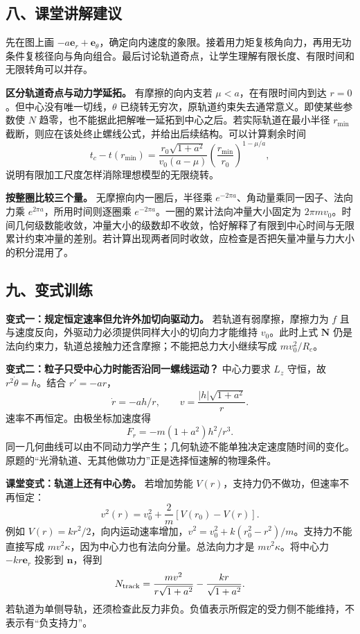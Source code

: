 \documentclass[12pt,a4paper,UTF8]{ctexart}
\begin{document}
\subsection{八、课堂讲解建议}\label{ux516bux8bfeux5802ux8bb2ux89e3ux5efaux8bae-1}

先在图上画
\(-a\boldsymbol e_r+\boldsymbol e_\theta\)，确定向内速度的象限。接着用力矩复核角向力，再用无功条件复核径向与角向组合。最后讨论轨道奇点，让学生理解有限长度、有限时间和无限转角可以并存。

\textbf{区分轨道奇点与动力学延拓。} 有摩擦的向内支若
\(\mu<a\)，在有限时间内到达 \(r=0\)。但中心没有唯一切线，\(\theta\)
已绕转无穷次，原轨道约束失去通常意义。即使某些参数使 \(N\)
趋零，也不能据此把解唯一延拓到中心之后。若实际轨道在最小半径
\(r_{\min}\)
截断，则应在该处终止螺线公式，并给出后续结构。可以计算剩余时间 \[
t_c-t(r_{\min})=
\frac{r_0\sqrt{1+a^2}}{v_0(a-\mu)}
\left(\frac{r_{\min}}{r_0}\right)^{1-\mu/a},
\] 说明有限加工尺度怎样消除理想模型的无限绕转。

\textbf{按整圈比较三个量。} 无摩擦向内一圈后，半径乘
\(e^{-2\pi a}\)、角动量乘同一因子、法向力乘
\(e^{2\pi a}\)，所用时间则逐圈乘
\(e^{-2\pi a}\)。一圈的累计法向冲量大小固定为
\(2\pi mv_0\)。时间几何级数能收敛，冲量大小的级数却不收敛，恰好解释了有限到中心时间与无限累计约束冲量的差别。若计算出现两者同时收敛，应检查是否把矢量冲量与力大小的积分混用了。

\subsection{九、变式训练}\label{ux4e5dux53d8ux5f0fux8badux7ec3-1}

\textbf{变式一：规定恒定速率但允许外加切向驱动力。}
若轨道有弱摩擦，摩擦力为 \(f\)
且与速度反向，外驱动力必须提供同样大小的切向力才能维持 \(v_0\)。此时上式
\(\boldsymbol N\)
仍是法向约束力，轨道总接触力还含摩擦；不能把总力大小继续写成
\(mv_0^2/R_c\)。

\textbf{变式二：粒子只受中心力时能否沿同一螺线运动？} 中心力要求 \(L_z\)
守恒，故 \(r^2\dot\theta=h\)。结合 \(r'=-ar\)， \[
\dot r=-ah/r,\qquad
v=\frac{|h|\sqrt{1+a^2}}r.
\] 速率不再恒定。由极坐标加速度得 \[
F_r=-m(1+a^2)h^2/r^3.
\]
同一几何曲线可以由不同动力学产生；几何轨迹不能单独决定速度随时间的变化。原题的``光滑轨道、无其他做功力''正是选择恒速解的物理条件。

\textbf{课堂变式：轨道上还有中心势。} 若增加势能
\(V(r)\)，支持力仍不做功，但速率不再恒定： \[
v^2(r)=v_0^2+\frac2m[V(r_0)-V(r)].
\] 例如
\(V(r)=kr^2/2\)，向内运动速率增加，\(v^2=v_0^2+k(r_0^2-r^2)/m\)。支持力不能直接写成
\(mv^2\kappa\)，因为中心力也有法向分量。总法向力才是
\(mv^2\kappa\)。将中心力 \(-kr\boldsymbol e_r\) 投影到
\(\boldsymbol n\)，得到 \[
N_{\rm track}=\frac{mv^2}{r\sqrt{1+a^2}}-\frac{kr}{\sqrt{1+a^2}}.
\]
若轨道为单侧导轨，还须检查此反力非负。负值表示所假定的受力侧不能维持，不表示有``负支持力''。
\end{document}
